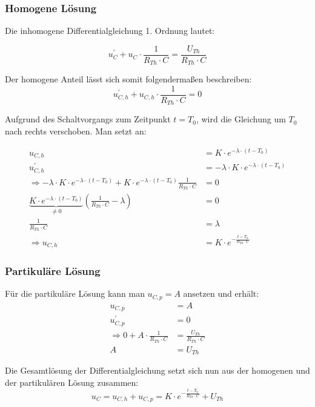 \documentclass[11pt]{scrartcl}
\begin{document}
\subsubsection{Homogene Lösung}
Die inhomogene Differentialgleichung 1. Ordnung lautet:

\begin{equation*}
  u_C^{\prime} + u_C \cdot \frac{1}{R_{Th} \cdot C} =  \frac{U_{Th}}{R_{Th} \cdot C}
\end{equation*}

Der homogene Anteil lässt sich somit folgendermaßen beschreiben:
\begin{equation*}
  u_{C,h}^{\prime} + u_{C,h} \cdot \frac{1}{R_{Th} \cdot C} = 0
\end{equation*}

Aufgrund des Schaltvorgangs zum  Zeitpunkt $t=T_0$, wird die Gleichung um $T_0$ nach rechts verschoben.
Man setzt an:

\begin{align*}
  u_{C,h} &= K \cdot e^{-\lambda \cdot (t-T_0)} \\
  u_{C,h}^{\prime} &= - \lambda \cdot K \cdot e^{-\lambda \cdot (t-T_0)} \\
  \Longrightarrow -\lambda \cdot K \cdot e^{-\lambda \cdot (t-T_0)} + K \cdot e^{-\lambda \cdot (t-T_0)} \frac{1}{R_{Th}\cdot C} &= 0 \\
  \underbrace{K \cdot e^{-\lambda \cdot (t-T_0)}}_{\neq 0} \left( \frac{1}{R_{Th}\cdot C} - \lambda\right) &= 0 \\
  \frac{1}{R_{Th}\cdot C} &= \lambda \\
  \Longrightarrow u_{C,h} &= K \cdot e^{-\frac{t-T_0}{R_{Th}\cdot C}}
\end{align*}

\subsubsection{Partikuläre Lösung}
Für die partikuläre Lösung kann man $u_{C,p} = A$ ansetzen und erhält:
\begin{align*}
  u_{C,p} &= A \\
  u_{C,p}^{\prime} &= 0 \\
  \Longrightarrow 0 + A \cdot \frac{1}{R_{Th}\cdot C} &= \frac{U_{Th}}{R_{Th}\cdot C} \\
  A &= U_{Th}
\end{align*}

Die Gesamtlösung der Differentialgleichung setzt sich nun aus der homogenen und der partikulären Lösung zusammen:
\begin{equation}\label{eq:diff}
  u_C = u_{C,h} + u_{C,p} = K \cdot e^{-\frac{t-T_0}{R_{Th}\cdot C}} + U_{Th}
\end{equation}
\end{document}
